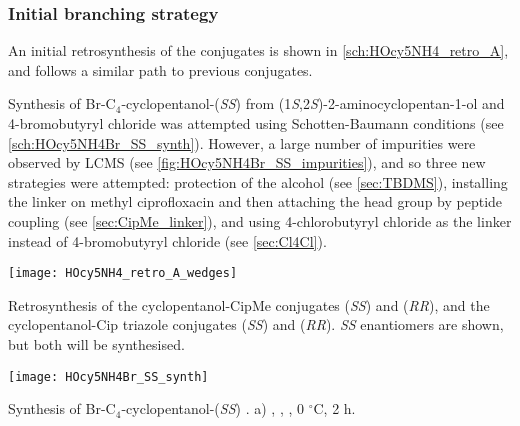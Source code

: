 \subsubsection{Initial branching strategy}

An initial retrosynthesis of the conjugates is shown in \ref{sch:HOcy5NH4_retro_A}, and follows a similar path to previous conjugates.

Synthesis of Br-C$_4$-cyclopentanol-(\textit{SS})  from (1\textit{S},2\textit{S})-2-aminocyclopentan-1-ol  and 4-bromobutyryl chloride  was attempted using Schotten-Baumann conditions (see \ref{sch:HOcy5NH4Br_SS_synth}). However, a large number of impurities were observed by LCMS (see \ref{fig:HOcy5NH4Br_SS_impurities}), and so three new strategies were attempted: protection of the alcohol (see \ref{sec:TBDMS}), installing the linker on methyl ciprofloxacin  and then attaching the head group by peptide coupling (see \ref{sec:CipMe_linker}), and using 4-chlorobutyryl chloride  as the linker instead of 4-bromobutyryl chloride  (see \ref{sec:Cl4Cl}).

\begin{scheme}[H]
	\begin{center}
		\texttt{[image: HOcy5NH4\_retro\_A\_wedges]}
		\caption{Retrosynthesis of the cyclopentanol-CipMe conjugates 
		 (\textit{SS}) and 
		 (\textit{RR}),
		and the cyclopentanol-Cip triazole conjugates 
		 (\textit{SS}) and   (\textit{RR}). 
		\textit{SS} enantiomers are shown, but both will be synthesised. \label{sch:HOcy5NH4_retro_A}}
	\end{center}
\end{scheme}




\begin{scheme}[H]
	\begin{center}
		\texttt{[image: HOcy5NH4Br\_SS\_synth]}
		\caption{Synthesis of Br-C$_4$-cyclopentanol-(\textit{SS}) .
		a) , , , 0 $^{\circ}$C, 2 h. \label{sch:HOcy5NH4Br_SS_synth}}
	\end{center}
\end{scheme}

